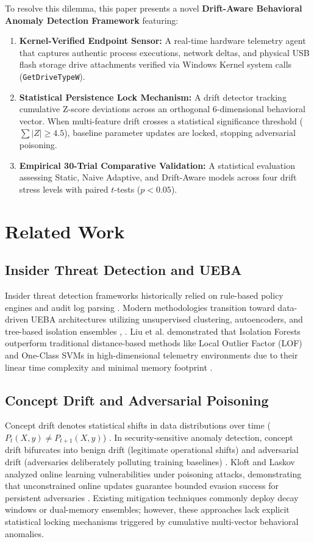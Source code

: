 \documentclass[conference]{IEEEtran}
\begin{document}
To resolve this dilemma, this paper presents a novel \textbf{Drift-Aware Behavioral Anomaly Detection Framework} featuring:
\begin{enumerate}
    \item \textbf{Kernel-Verified Endpoint Sensor:} A real-time hardware telemetry agent that captures authentic process executions, network deltas, and physical USB flash storage drive attachments verified via Windows Kernel system calls (\texttt{GetDriveTypeW}).
    \item \textbf{Statistical Persistence Lock Mechanism:} A drift detector tracking cumulative Z-score deviations across an orthogonal 6-dimensional behavioral vector. When multi-feature drift crosses a statistical significance threshold ($\sum |Z| \ge 4.5$), baseline parameter updates are locked, stopping adversarial poisoning.
    \item \textbf{Empirical 30-Trial Comparative Validation:} A statistical evaluation assessing Static, Naive Adaptive, and Drift-Aware models across four drift stress levels with paired $t$-tests ($p < 0.05$).
\end{enumerate}

\section{Related Work}
\subsection{Insider Threat Detection and UEBA}
Insider threat detection frameworks historically relied on rule-based policy engines and audit log parsing \cite{b2}. Modern methodologies transition toward data-driven UEBA architectures utilizing unsupervised clustering, autoencoders, and tree-based isolation ensembles \cite{b3}, \cite{b7}. Liu et al. demonstrated that Isolation Forests outperform traditional distance-based methods like Local Outlier Factor (LOF) and One-Class SVMs in high-dimensional telemetry environments due to their linear time complexity and minimal memory footprint \cite{b4}.

\subsection{Concept Drift and Adversarial Poisoning}
Concept drift denotes statistical shifts in data distributions over time ($P_t(X, y) \neq P_{t+1}(X, y)$) \cite{b5}. In security-sensitive anomaly detection, concept drift bifurcates into benign drift (legitimate operational shifts) and adversarial drift (adversaries deliberately polluting training baselines) \cite{b6}. Kloft and Laskov analyzed online learning vulnerabilities under poisoning attacks, demonstrating that unconstrained online updates guarantee bounded evasion success for persistent adversaries \cite{b8}. Existing mitigation techniques commonly deploy decay windows or dual-memory ensembles; however, these approaches lack explicit statistical locking mechanisms triggered by cumulative multi-vector behavioral anomalies.
\end{document}
